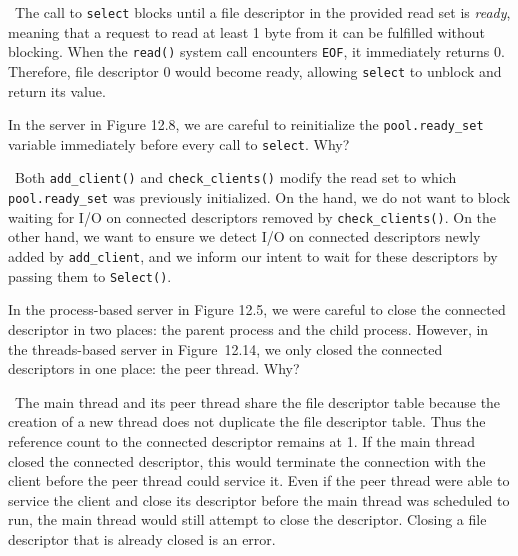 \documentclass[12pt]{article}
\newenvironment{ex}[2][Exercise]{\begin{trivlist}
		\item[\hskip \labelsep {\bfseries #1}\hskip \labelsep {\bfseries #2.}]}{\end{trivlist}}
\newenvironment{sol}[1][Solution]{\begin{trivlist}
		\item[\hskip \labelsep {\bfseries #1:}]}{\end{trivlist}}
\begin{document}
\begin{sol}
	\
	The call to \texttt{select} blocks until a file descriptor in the provided read set is
	\emph{ready}, meaning that a request to read at least 1 byte from it can be fulfilled
	without blocking. When the \texttt{read()} system call encounters \texttt{EOF}, it immediately
	returns 0. Therefore, file descriptor 0 would become ready, allowing \texttt{select} to unblock
	and return its value.
\end{sol}

\begin{ex}{12.4}
	In the server in Figure 12.8, we are careful to reinitialize the \texttt{pool.ready\_set}
	variable immediately before every call to \texttt{select}. Why?
\end{ex}

\begin{sol}
	\
	Both \texttt{add\_client()} and \texttt{check\_clients()} modify the read set to which
	\texttt{pool.ready\_set} was previously initialized. On the hand, we do not want to block
	waiting for I/O on connected descriptors removed by \texttt{check\_clients()}. On the other
	hand, we want to ensure we detect I/O on connected descriptors newly added by \texttt{add\_client},
	and we inform our intent to wait for these descriptors by passing them to \texttt{Select()}.
\end{sol}

\begin{ex}{12.5}
	In the process-based server in Figure 12.5, we were careful to close the connected descriptor
	in two places: the parent process and the child process. However, in the threads-based server
	in Figure~12.14, we only closed the connected descriptors in one place: the peer thread. Why?
\end{ex}

\begin{sol}
	\
	The main thread and its peer thread share the file descriptor table because the creation
	of a new thread does not duplicate the file descriptor table. Thus the reference count to
	the connected descriptor remains at 1. If the main thread closed the connected descriptor,
	this would terminate the connection with the client before the peer thread could service it.
	Even if the peer thread were able to service the client and close its descriptor before the
	main thread was scheduled to run, the main thread would still attempt to close the descriptor.
	Closing a file descriptor that is already closed is an error.
\end{sol}
\end{document}
